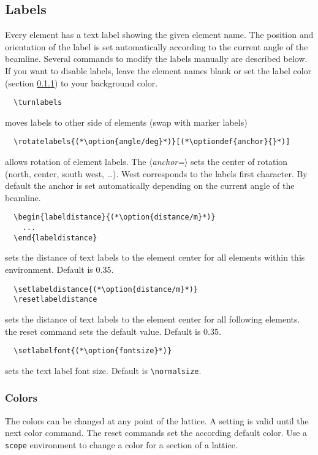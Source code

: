 \documentclass[a4paper]{scrartcl}
\newcommand{\option}[1]{{\color{blue}$\langle$\textit{#1}$\rangle$}}
\newcommand{\optiondef}[2]{{\color{green!50!black}$\langle$\textit{#1=#2}$\rangle$}}
\begin{document}
\subsection{Labels}
\label{sec:labels}
Every element has a text label showing the given element name. The position and
orientation of the label is set automatically according to the current angle of the
beamline. Several commands to modify the labels manually are described below. If you want
to disable labels, leave the element names blank or set the label color (section \ref{sec:colors}) to your background color.

\begin{lstlisting}
  \turnlabels
\end{lstlisting}
moves labels to other side of elements (swap with marker labels)

\begin{lstlisting}
  \rotatelabels{(*\option{angle/deg}*)}[(*\optiondef{anchor}{}*)]
\end{lstlisting}
allows rotation of element labels.
The \optiondef{anchor}{} sets the center of rotation (north, center, south west,
\ldots{}). West corresponds to the labels first character. By default the anchor is set
automatically depending on the current angle of the beamline.

\begin{lstlisting}
  \begin{labeldistance}{(*\option{distance/m}*)}
    ...
  \end{labeldistance}
\end{lstlisting}
sets the distance of text labels to the element center for all elements within this
environment. Default is 0.35.

\begin{lstlisting}
  \setlabeldistance{(*\option{distance/m}*)}
  \resetlabeldistance
\end{lstlisting}
sets the distance of text labels to the element center for all following elements. the
reset command sets the default value. Default is 0.35.

\begin{lstlisting}
  \setlabelfont{(*\option{fontsize}*)}
\end{lstlisting}
sets the text label font size. Default is \lstinline+\normalsize+.



\subsubsection{Colors}
\label{sec:colors}
The colors can be changed at any point of the lattice. A setting is valid until the next
color command. The reset commands set the according default color. Use a \lstinline+scope+
environment to change a color for a section of a lattice.
\end{document}
